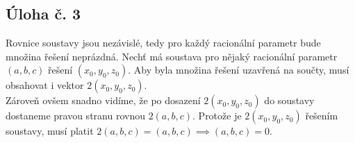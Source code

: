 \documentclass{scrartcl}
\begin{document}
\subsection*{Úloha č. 3}
Rovnice soustavy jsou nezávislé, tedy pro každý racionální parametr bude množina řešení neprázdná. Nechť má soustava pro nějaký racionální parametr $(a,b,c)$ řešení $(x_0,y_0,z_0)$. Aby byla množina řešení uzavřená na součty, musí obsahovat i vektor $2(x_0,y_0,z_0)$. \\

Zároveň ovšem snadno vidíme, že po dosazení $2(x_0,y_0,z_0)$ do soustavy dostaneme pravou stranu rovnou $2(a,b,c)$. Protože je $2(x_0,y_0,z_0)$ řešením soustavy, musí platit $2(a,b,c) = (a,b,c) \implies (a,b,c) = 0$.
\end{document}
